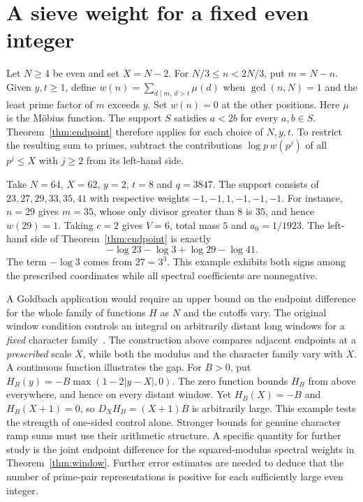\documentclass[11pt,a4paper]{article}
\begin{document}
\section{A sieve weight for a fixed even integer}
Let $N\ge4$ be even and set $X=N-2$. For $N/3\le n<2N/3$, put $m=N-n$. Given $y,t\ge1$, define $w(n)=\sum_{d\mid m,\ d>t}\mu(d)$ when $\gcd(n,N)=1$ and the least prime factor of $m$ exceeds $y$. Set $w(n)=0$ at the other positions. Here $\mu$ is the M\"obius function. The support $S$ satisfies $a<2b$ for every $a,b\in S$. Theorem~\ref{thm:endpoint} therefore applies for each choice of $N,y,t$. To restrict the resulting sum to primes, subtract the contributions $\log p\,w(p^j)$ of all $p^j\le X$ with $j\ge2$ from its left-hand side.

Take $N=64$, $X=62$, $y=2$, $t=8$ and $q=3847$. The support consists of $23,27,29,33,35,41$ with respective weights $-1,-1,1,-1,-1,-1$. For instance, $n=29$ gives $m=35$, whose only divisor greater than $8$ is $35$, and hence $w(29)=1$. Taking $c=2$ gives $V=6$, total mass $5$ and $a_0=1/1923$. The left-hand side of Theorem~\ref{thm:endpoint} is exactly
\[
  -\log 23-\log 3+\log 29-\log 41.
\]
The term $-\log3$ comes from $27=3^3$. This example exhibits both signs among the prescribed coordinates while all spectral coefficients are nonnegative.

A Goldbach application would require an upper bound on the endpoint difference for the whole family of functions $H$ as $N$ and the cutoffs vary. The original window condition controls an integral on arbitrarily distant long windows for a \emph{fixed} character family~\cite{alps}. The construction above compares adjacent endpoints at a \emph{prescribed} scale $X$, while both the modulus and the character family vary with $X$. A continuous function illustrates the gap. For $B>0$, put $H_B(y)=-B\max(1-2|y-X|,0)$. The zero function bounds $H_B$ from above everywhere, and hence on every distant window. Yet $H_B(X)=-B$ and $H_B(X+1)=0$, so $D_XH_B=(X+1)B$ is arbitrarily large. This example tests the strength of one-sided control alone. Stronger bounds for genuine character ramp sums must use their arithmetic structure. A specific quantity for further study is the joint endpoint difference for the squared-modulus spectral weights in Theorem~\ref{thm:window}. Further error estimates are needed to deduce that the number of prime-pair representations is positive for each sufficiently large even integer.
\end{document}
